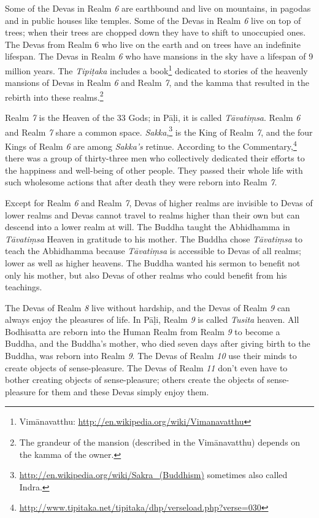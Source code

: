 Some of the Devas in Realm \textit{6} are earthbound and live on mountains, in pagodas and in public houses like temples. Some of the Devas in Realm \textit{6} live on top of trees; when their trees are chopped down they have to shift to unoccupied ones. The Devas from Realm 6 who live on the earth and on trees have an indefinite lifespan. The Devas in Realm \textit{6} who have mansions in the sky have a lifespan of 9 million years. The \textit{Tipiṭaka} includes a book\footnote{Vimānavatthu: \url{http://en.wikipedia.org/wiki/Vimanavatthu} } dedicated to stories of the heavenly mansions of Devas in Realm \textit{6} and Realm \textit{7}, and the kamma that resulted in the rebirth into these realms.\footnote{The grandeur of the mansion (described in the Vimānavatthu) depends on the kamma of the owner.}

Realm \textit{7} is the Heaven of the 33 Gods; in Pāḷi, it is called \textit{Tāvatiṃsa}. Realm \textit{6} and Realm \textit{7} share a common space. \textit{Sakka},\footnote{\url{http://en.wikipedia.org/wiki/Sakra_(Buddhism)} sometimes also called Indra.} is the King of Realm \textit{7}, and the four Kings of Realm \textit{6} are among \textit{Sakka’s} retinue. According to the Commentary,\footnote{\url{http://www.tipitaka.net/tipitaka/dhp/verseload.php?verse=030}} there was a group of thirty-three men who collectively dedicated their efforts to the happiness and well-being of other people. They passed their whole life with such wholesome actions that after death they were reborn into Realm \textit{7}.

Except for Realm \textit{6} and Realm \textit{7}, Devas of higher realms are invisible to Devas of lower realms and Devas cannot travel to realms higher than their own but can descend into a lower realm at will. The Buddha taught the Abhidhamma in \textit{Tāvatiṃsa} Heaven in gratitude to his mother. The Buddha chose \textit{Tāvatiṃsa} to teach the Abhidhamma because \textit{Tāvatiṃsa} is accessible to Devas of all realms; lower as well as higher heavens. The Buddha wanted his sermon to benefit not only his mother, but also Devas of other realms who could benefit from his teachings.

The Devas of Realm \textit{8} live without hardship, and the Devas of Realm \textit{9} can always enjoy the pleasures of life. In Pāḷi, Realm \textit{9} is called \textit{Tusita} heaven. All Bodhisatta are reborn into the Human Realm from Realm \textit{9} to become a Buddha, and the Buddha’s mother, who died seven days after giving birth to the Buddha, was reborn into Realm \textit{9}. The Devas of Realm \textit{10} use their minds to create objects of sense-pleasure. The Devas of Realm \textit{11} don’t even have to bother creating objects of sense-pleasure; others create the objects of sense-pleasure for them and these Devas simply enjoy them.

